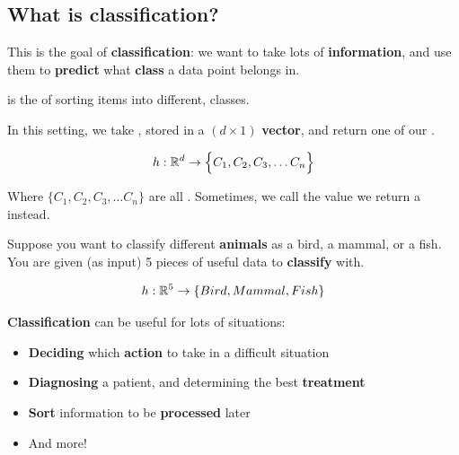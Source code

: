     \subsection{What is classification?}
        
        This is the goal of \textbf{classification}: we want to take lots of \textbf{information}, and use them to \textbf{predict} what \textbf{class} a data point belongs in.\\
        
        \begin{definition}
             is the  of sorting items into different,  classes.
            
            In this setting, we take , stored in a $(d \times 1)$ \textbf{vector}, and return one of our .
            
            \begin{equation*}
                h: \mathbb R^d \rightarrow \Bigl\{C_1, C_2, C_3, \dots C_n\Bigr\}
            \end{equation*}
            
            Where $\{C_1, C_2, C_3, \dots C_n\}$ are all . Sometimes, we call the value we return a  instead.
        \end{definition}
        
        
        \miniex Suppose you want to classify different \textbf{animals} as a bird, a mammal, or a fish. You are given (as input) 5 pieces of useful data to \textbf{classify} with.
        
        \begin{equation}
            h: \mathbb R^5 \rightarrow \{ Bird, Mammal, Fish \}
        \end{equation}
        
                \textbf{Classification} can be useful for lots of situations:

        \begin{itemize}
            \item \textbf{Deciding} which \textbf{action} to take in a difficult situation
            
            \item \textbf{Diagnosing} a patient, and determining the best \textbf{treatment}
            
            \item \textbf{Sort} information to be \textbf{processed} later
            \item And more!\\
        \end{itemize}
        
